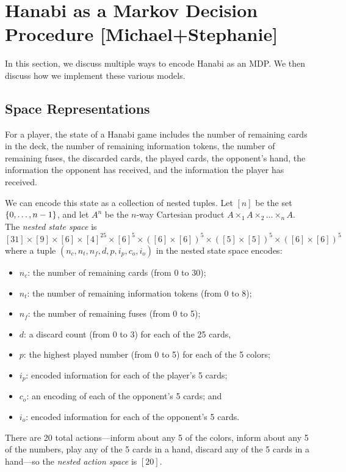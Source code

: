 \section{Hanabi as a Markov Decision Procedure [Michael+Stephanie]}\label{sec:hanabimdp}

In this section, we discuss multiple ways to encode Hanabi as an MDP. We then
discuss how we implement these various models.

\subsection{Space Representations}
For a player, the state of a Hanabi game includes the number of remaining cards
in the deck, the number of remaining information tokens, the number of
remaining fuses, the discarded cards, the played cards, the opponent's hand,
the information the opponent has received, and the information the player has
received.

We can encode this state as a collection of nested tuples. Let $[n]$ be the set
$\left\{0, \ldots, n-1\right\}$, and let $A^n$ be the $n$-way Cartesian product $A
\times_1 A \times_2 \ldots \times_n A$.
The \emph{nested state space} is \[
  [31] \times
  [9] \times
  [6] \times
  {[4]}^{25}
  \times
  {[6]}^5
  \times {([6] \times [6])}^5
  \times {([5] \times [5])}^5
  \times {([6] \times [6])}^5
\]
where a tuple $(n_c, n_t, n_f, d, p, i_p, c_o, i_o)$ in the nested state space
encodes:
\begin{itemize}
  \setlength\itemsep{0em}
  \item $n_c$: the number of remaining cards (from 0 to 30);
  \item $n_t$: the number of remaining information tokens (from 0 to 8);
  \item $n_f$: the number of remaining fuses (from 0 to 5);
  \item $d$: a discard count (from 0 to 3) for each of the 25 cards,
  \item $p$: the highest played number (from 0 to 5) for each of the 5 colors;
  \item $i_p$: encoded information for each of the player's 5 cards;
  \item $c_o$: an encoding of each of the opponent's 5 cards; and
  \item $i_o$: encoded information for each of the opponent's 5 cards.
\end{itemize}
There are 20 total actions---inform about any 5 of the colors, inform about any
5 of the numbers, play any of the 5 cards in a hand, discard any of the 5 cards
in a hand---so the \emph{nested action space} is $[20]$.

